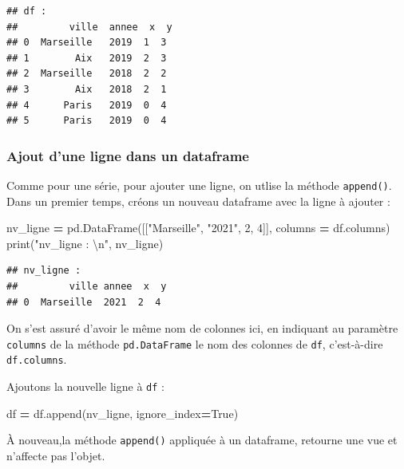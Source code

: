 \documentclass[12pt,]{book}
\newenvironment{Shaded}{\begin{snugshade}}{\end{snugshade}}
\newcommand{\DecValTok}[1]{\textcolor[rgb]{0.00,0.00,0.81}{#1}}
\newcommand{\CharTok}[1]{\textcolor[rgb]{0.31,0.60,0.02}{#1}}
\newcommand{\StringTok}[1]{\textcolor[rgb]{0.31,0.60,0.02}{#1}}
\newcommand{\VariableTok}[1]{\textcolor[rgb]{0.00,0.00,0.00}{#1}}
\newcommand{\OperatorTok}[1]{\textcolor[rgb]{0.81,0.36,0.00}{\textbf{#1}}}
\newcommand{\BuiltInTok}[1]{#1}
\newcommand{\NormalTok}[1]{#1}
\numberwithin{equation}{section}
\numberwithin{countremarque}{section}
\begin{document}
\begin{lstlisting}
## df : 
##         ville  annee  x  y
## 0  Marseille   2019  1  3
## 1        Aix   2019  2  3
## 2  Marseille   2018  2  2
## 3        Aix   2018  2  1
## 4      Paris   2019  0  4
## 5      Paris   2019  0  4
\end{lstlisting}

\subsubsection{Ajout d'une ligne dans un
dataframe}\label{pandas-ajout-ligne-df}

Comme pour une série, pour ajouter une ligne, on utlise la méthode
\texttt{append()}. Dans un premier temps, créons un nouveau dataframe
avec la ligne à ajouter :

\begin{Shaded}
\begin{Highlighting}[]
\NormalTok{nv_ligne }\OperatorTok{=}\NormalTok{ pd.DataFrame([[}\StringTok{"Marseille"}\NormalTok{, }\StringTok{"2021"}\NormalTok{, }\DecValTok{2}\NormalTok{, }\DecValTok{4}\NormalTok{]],}
\NormalTok{                       columns }\OperatorTok{=}\NormalTok{ df.columns)}
\BuiltInTok{print}\NormalTok{(}\StringTok{"nv_ligne : }\CharTok{\textbackslash{}n}\StringTok{"}\NormalTok{, nv_ligne)}
\end{Highlighting}
\end{Shaded}

\begin{lstlisting}
## nv_ligne : 
##         ville annee  x  y
## 0  Marseille  2021  2  4
\end{lstlisting}

On s'est assuré d'avoir le même nom de colonnes ici, en indiquant au
paramètre \texttt{columns} de la méthode \texttt{pd.DataFrame} le nom
des colonnes de \texttt{df}, c'est-à-dire \texttt{df.columns}.

Ajoutons la nouvelle ligne à \texttt{df} :

\begin{Shaded}
\begin{Highlighting}[]
\NormalTok{df }\OperatorTok{=}\NormalTok{ df.append(nv_ligne, ignore_index}\OperatorTok{=}\VariableTok{True}\NormalTok{)}
\end{Highlighting}
\end{Shaded}

À nouveau,la méthode \texttt{append()} appliquée à un dataframe,
retourne une vue et n'affecte pas l'objet.
\end{document}
